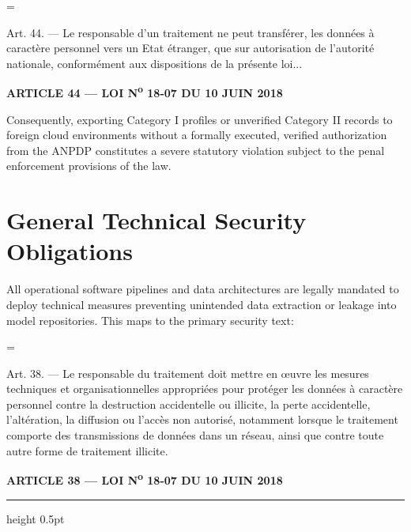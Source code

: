 \documentclass[11pt,a4paper]{article}
\newenvironment{legalquote}{
    \begin{list}{}{
        \leftmargin=0.5in
        \rightmargin=0in
        \topsep=6pt
        \partopsep=0pt
        \parsep=\parskip
    }
    \item[]\itshape
}{
    \end{list}
}
\begin{document}
\begin{legalquote}
    Art. 44. — Le responsable d'un traitement ne peut transférer, les données à caractère personnel vers un Etat étranger, que sur autorisation de l'autorité nationale, conformément aux dispositions de la présente loi...
\end{legalquote}
\hfill {\footnotesize\bfseries ARTICLE 44 — LOI N\textsuperscript{o} 18-07 DU 10 JUIN 2018}

Consequently, exporting Category I profiles or unverified Category II records to foreign cloud environments without a formally executed, verified authorization from the ANPDP constitutes a severe statutory violation subject to the penal enforcement provisions of the law.

\section{General Technical Security Obligations}
All operational software pipelines and data architectures are legally mandated to deploy technical measures preventing unintended data extraction or leakage into model repositories. This maps to the primary security text:

\begin{legalquote}
    Art. 38. — Le responsable du traitement doit mettre en œuvre les mesures techniques et organisationnelles appropriées pour protéger les données à caractère personnel contre la destruction accidentelle ou illicite, la perte accidentelle, l'altération, la diffusion ou l'accès non autorisé, notamment lorsque le traitement comporte des transmissions de données dans un réseau, ainsi que contre toute autre forme de traitement illicite.
\end{legalquote}
\hfill {\footnotesize\bfseries ARTICLE 38 — LOI N\textsuperscript{o} 18-07 DU 10 JUIN 2018}


\vspace{20pt}
\hrule height 0.5pt
\vspace{4pt}
\end{document}
